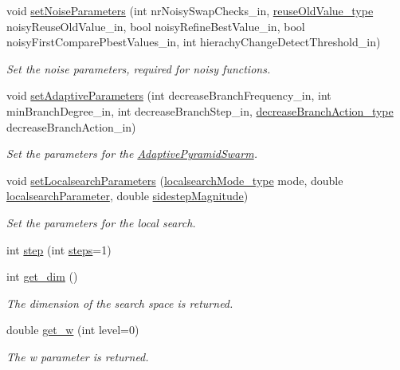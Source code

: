 \begin{CompactItemize}
void \hyperlink{classPSO_c58c125453c245064c30b4dd04bf8d52}{setNoiseParameters} (int nrNoisySwapChecks\_\-in, \hyperlink{pso_8h_755d79b857f07ae8fe54530574012aa0}{reuseOldValue\_\-type} noisyReuseOldValue\_\-in, bool noisyRefineBestValue\_\-in, bool noisyFirstComparePbestValues\_\-in, int hierachyChangeDetectThreshold\_\-in)
\begin{CompactList}\small\item\em Set the noise parameters, required for noisy functions. \item\end{CompactList}\item 
void \hyperlink{classPSO_1c88abec5f825f444bc0ad5f910ce639}{setAdaptiveParameters} (int decreaseBranchFrequency\_\-in, int minBranchDegree\_\-in, int decreaseBranchStep\_\-in, \hyperlink{pso_8h_370ff96360c4ce9d7da2123deeee0a09}{decreaseBranchAction\_\-type} decreaseBranchAction\_\-in)
\begin{CompactList}\small\item\em Set the parameters for the \hyperlink{classAdaptivePyramidSwarm}{AdaptivePyramidSwarm}. \item\end{CompactList}\item 
void \hyperlink{classPSO_d58d6a6ba1ebd6df471867389487feab}{setLocalsearchParameters} (\hyperlink{pso_8h_5e93114874fd3e3df67f0db1a4212e49}{localsearchMode\_\-type} mode, double \hyperlink{runpso_8cpp_48cf0abf8dc8ee5ee49e48099e8c7f1a}{localsearchParameter}, double \hyperlink{runpso_8cpp_e18ddf31df01d89764ef58d8441578cd}{sidestepMagnitude})
\begin{CompactList}\small\item\em Set the parameters for the local search. \item\end{CompactList}\item 
int \hyperlink{classPSO_3a301551494012faac2c6db981ae269e}{step} (int \hyperlink{runpso_8cpp_b4ae7205573977222eadd0795db193e2}{steps}=1)
\item 
int \hyperlink{classPSO_9da7242360b57a226143a6b60547021b}{get\_\-dim} ()
\begin{CompactList}\small\item\em The dimension of the search space is returned. \item\end{CompactList}\item 
double \hyperlink{classPSO_cb91e8b9fd0329a817d7d435ca75c718}{get\_\-w} (int level=0)
\begin{CompactList}\small\item\em The w parameter is returned. \item\end{CompactList}\item 

\end{CompactItemize}
